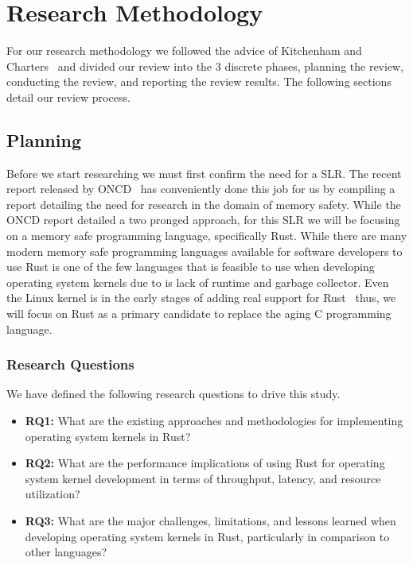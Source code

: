 \documentclass[sigconf,review,anonymous]{acmart}
\begin{document}
\section{Research Methodology}

For our research methodology we followed the advice of Kitchenham and Charters~\cite{Stuart2007-cc}
and divided our review into the 3 discrete phases, planning the review, conducting the review, and
reporting the review results. The following sections detail our review process.

\subsection{Planning}

Before we start researching we must first confirm the need for a SLR. The recent report released by
ONCD~\cite{United_States_Gov2024-pp} has conveniently done this job for us by compiling a report
detailing the need for research in the domain of memory safety. While the ONCD report detailed a two
pronged approach, for this SLR we will be focusing on a memory safe programming language,
specifically Rust. While there are many modern memory safe programming languages available for
software developers to use Rust is one of the few languages that is feasible to use when developing
operating system kernels due to is lack of runtime and garbage collector. Even the Linux kernel is
in the early stages of adding real support for
Rust~\cite{The_kernel_development_community_undated-iw} thus, we will focus on Rust as a primary
candidate to replace the aging C programming language.

\subsubsection{Research Questions}
\label{sec:researchQuestions}

We have defined the following research questions to drive this study.

\begin{itemize}
    \item \textbf{RQ1:} What are the existing approaches and methodologies for implementing
      operating system kernels in Rust?
    \item \textbf{RQ2:} What are the performance implications of using Rust for operating system
      kernel development in terms of throughput, latency, and resource utilization?
    \item \textbf{RQ3:} What are the major challenges, limitations, and lessons learned when
      developing operating system kernels in Rust, particularly in comparison to other languages?
\end{itemize}
\end{document}
